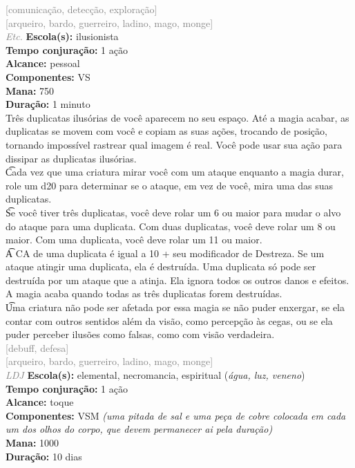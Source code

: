 \documentclass{RPG_Adventure}[2021/10/20]
\begin{document}
{\scriptsize \textcolor{gray}{[comunicação, detecção, exploração]\\}}
{\scriptsize \textcolor{gray}{[arqueiro, bardo, guerreiro, ladino, mago, monge]\\}}
{\tiny \textcolor{gray}{\textit{Etc.}}}
{\small \t \textbf{Escola(s):} ilusionista\\\t \textbf{Tempo conjuração:} 1 ação\\\t \textbf{Alcance:} pessoal\\\t \textbf{Componentes:} VS\\\t \textbf{Mana:} 750\\\t \textbf{Duração:} 1 minuto\\}
{\normalsize Três duplicatas ilusórias de você aparecem no seu espaço.  Até a magia acabar, as duplicatas se movem com você e copiam as suas ações, trocando de posição, tornando impossível rastrear qual imagem é real. Você pode usar sua ação para dissipar as duplicatas ilusórias.\\\t Cada vez que uma criatura mirar você com um ataque enquanto a magia durar, role um d20 para determinar se o ataque, em vez de você, mira uma das suas duplicatas.\\\t Se você tiver três duplicatas, você deve rolar um 6 ou maior para mudar o alvo do ataque para uma duplicata.  Com duas duplicatas, você deve rolar um 8 ou maior. Com uma duplicata, você deve rolar um 11 ou maior.\\\t A CA de uma duplicata é igual a 10 + seu modificador de Destreza. Se um ataque atingir uma duplicata, ela é destruída. Uma duplicata só pode ser destruída por um ataque que a atinja. Ela ignora todos os outros danos e efeitos. A magia acaba quando todas as três duplicatas forem destruídas.\\\t Uma criatura não pode ser afetada por essa magia se não puder enxergar, se ela contar com outros sentidos além da visão, como percepção às cegas, ou se ela puder perceber ilusões como falsas, como com visão verdadeira.\\}
{\scriptsize \textcolor{gray}{[debuff, defesa]\\}}
{\scriptsize \textcolor{gray}{[arqueiro, bardo, guerreiro, ladino, mago, monge]\\}}
{\tiny \textcolor{gray}{\textit{LDJ}}}
{\small \t \textbf{Escola(s):} elemental, necromancia, espiritual (\textit{água, luz, veneno})\\\t \textbf{Tempo conjuração:} 1 ação\\\t \textbf{Alcance:} toque\\\t \textbf{Componentes:} VSM \textit{(uma pitada de sal e uma peça de cobre colocada em cada um dos olhos do corpo, que devem permanecer ai pela duração)}\\\t \textbf{Mana:} 1000\\\t \textbf{Duração:} 10 dias\\}
\end{document}
